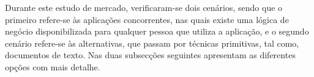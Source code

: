 Durante este estudo de mercado, verificaram-se dois cenários, sendo que o primeiro refere-se às aplicações concorrentes, nas quais existe uma lógica de negócio disponibilizada para qualquer pessoa que utiliza a aplicação, e o segundo cenário refere-se às alternativas, que passam por técnicas primitivas, tal como, documentos de texto. Nas duas subsecções seguintes apresentam as diferentes opções com mais detalhe.


